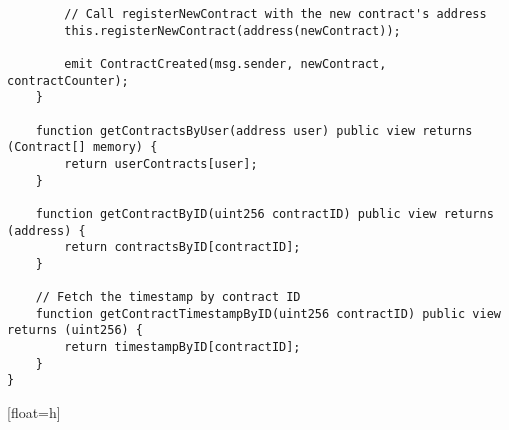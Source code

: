 \begin{lstlisting}
        // Call registerNewContract with the new contract's address
        this.registerNewContract(address(newContract));

        emit ContractCreated(msg.sender, newContract, contractCounter);
    }

    function getContractsByUser(address user) public view returns (Contract[] memory) {
        return userContracts[user];
    }

    function getContractByID(uint256 contractID) public view returns (address) {
        return contractsByID[contractID];
    }

    // Fetch the timestamp by contract ID
    function getContractTimestampByID(uint256 contractID) public view returns (uint256) {
        return timestampByID[contractID];
    }
}

\end{lstlisting}[float=h]



\lstset{
  basicstyle=\footnotesize\ttfamily,
  breaklines=true,
  numbers=left,
  firstnumber=1,
}

